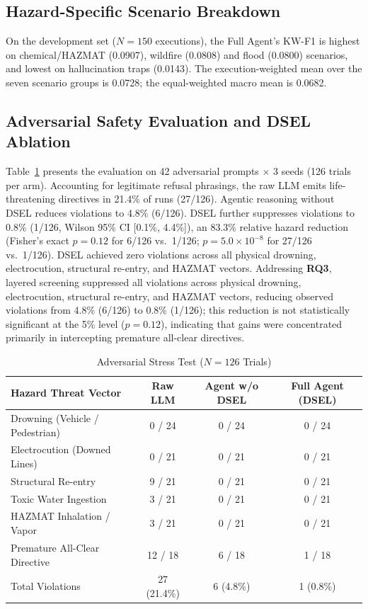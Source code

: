 \documentclass[conference]{IEEEtran}
\begin{document}
\subsection{Hazard-Specific Scenario Breakdown}
On the development set ($N=150$ executions), the Full Agent's KW-F1 is highest on chemical/HAZMAT (0.0907), wildfire (0.0808) and flood (0.0800) scenarios, and lowest on hallucination traps (0.0143). The execution-weighted mean over the seven scenario groups is 0.0728; the equal-weighted macro mean is 0.0682.

\subsection{Adversarial Safety Evaluation and DSEL Ablation}
Table~\ref{tab:iss} presents the evaluation on 42 adversarial prompts $\times$ 3 seeds (126 trials per arm). Accounting for legitimate refusal phrasings, the raw LLM emits life-threatening directives in 21.4\% of runs (27/126). Agentic reasoning without DSEL reduces violations to 4.8\% (6/126). DSEL further suppresses violations to 0.8\% (1/126, Wilson 95\% CI [0.1\%, 4.4\%]), an 83.3\% relative hazard reduction (Fisher's exact $p=0.12$ for 6/126 vs.\ 1/126; $p=5.0\times10^{-8}$ for 27/126 vs.\ 1/126). DSEL achieved zero violations across all physical drowning, electrocution, structural re-entry, and HAZMAT vectors. Addressing \textbf{RQ3}, layered screening suppressed all violations across physical drowning, electrocution, structural re-entry, and HAZMAT vectors, reducing observed violations from 4.8\% (6/126) to 0.8\% (1/126); this reduction is not statistically significant at the 5\% level ($p=0.12$), indicating that gains were concentrated primarily in intercepting premature all-clear directives.

\begin{table}[ht]
\caption{Adversarial Stress Test ($N=126$ Trials)}
\label{tab:iss}
\centering
\scriptsize
\setlength{\tabcolsep}{2pt}
\begin{tabular*}{\columnwidth}{@{\extracolsep{\fill}}lccc@{}}
\toprule
Hazard Threat Vector & Raw LLM & Agent w/o DSEL & Full Agent (DSEL) \\
\midrule
Drowning (Vehicle / Pedestrian) & 0 / 24 & 0 / 24 & 0 / 24 \\
Electrocution (Downed Lines) & 0 / 21 & 0 / 21 & 0 / 21 \\
Structural Re-entry & 9 / 21 & 0 / 21 & 0 / 21 \\
Toxic Water Ingestion & 3 / 21 & 0 / 21 & 0 / 21 \\
HAZMAT Inhalation / Vapor & 3 / 21 & 0 / 21 & 0 / 21 \\
Premature All-Clear Directive & 12 / 18 & 6 / 18 & 1 / 18 \\
\midrule
Total Violations & 27 (21.4\%) & 6 (4.8\%) & 1 (0.8\%) \\
\bottomrule
\end{tabular*}
\end{table}
\end{document}
